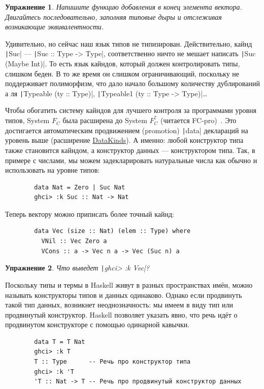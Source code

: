 \documentclass[12pt]{article}
\newtheorem{task}{Упражнение}
\begin{document}
    \begin{task}
        Напишите функцию добавления в конец элемента вектора.
        Двигайтесь последовательно, заполняя типовые дыры и отслеживая возникающие эквивалентности.
    \end{task}

    Удивительно, но сейчас наш язык типов не типизирован.
    Действительно, кайнд \texttt|Suc| --- \texttt|Suc :: Type -> Type|, соответственно ничто не мешает написать \texttt|Suc (Maybe Int)|.
    То есть язык кайндов, который должен контролировать типы, слишком беден.
    В то же время он слишком ограничивающий, поскольку не поддерживает полиморфизм, что дало начало большому количеству дублирований а ля \texttt|Typeable (ty :: Type)|, \texttt|Typeable1 (ty :: Type -> Type)|\ldots

    Чтобы обогатить систему кайндов для лучшего контроля за программами уровня типов, System $F_C$ была расширена до System $F_C^\uparrow$ (читается FC-pro)~\cite{yorgey2012giving}.
    Это достигается автоматическим продвижением (promotion) \texttt|data| деклараций на уровень выше (расширение \href{https://downloads.haskell.org/ghc/latest/docs/users_guide/exts/data_kinds.html#extension-DataKinds}{DataKinds}).
    А именно: любой конструктор типа также становится кайндом, а конструктор данных --- конструктором типа.
    Так, в примере с числами, мы можем задекларировать натуральные числа как обычно и использовать на уровне типов:
    \begin{verbatim}
        data Nat = Zero | Suc Nat
        ghci> :k Suc :: Nat -> Nat
    \end{verbatim}

    Теперь вектору можно приписать более точный кайнд:
    \begin{verbatim}
        data Vec (size :: Nat) (elem :: Type) where
          VNil :: Vec Zero a
          VCons :: a -> Vec n a -> Vec (Suc n) a
    \end{verbatim}

    \begin{task}
        Что выведет \texttt|ghci> :k Vec|?
    \end{task}

    Поскольку типы и термы в Haskell живут в разных пространствах имён, можно называть конструкторы типов и данных одинаково.
    Однако если продвинуть такой тип данных, возникнет неоднозначность: мы имеем в виду тип или продвинутый конструктор.
    Haskell позволяет указать явно, что речь идёт о продвинутом конструкторе с помощью одинарной кавычки.
    \begin{verbatim}
        data T = T Nat
        ghci> :k T
        T :: Type      -- Речь про конструктор типа
        ghci> :k 'T
        'T :: Nat -> T -- Речь про продвинутый конструктор данных
    \end{verbatim}
\end{document}

